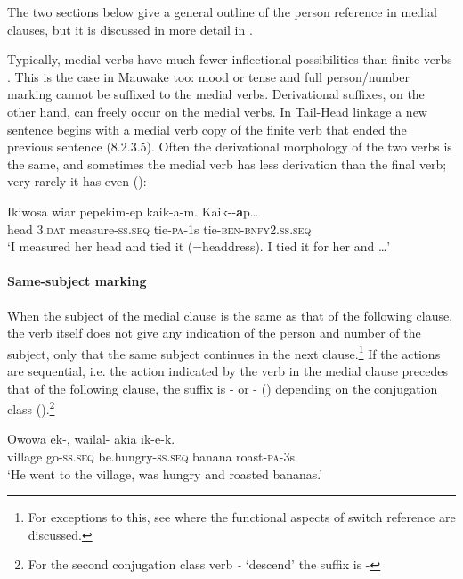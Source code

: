 The two sections below give a general outline of the person reference in medial clauses, but it is discussed in more detail in .

Typically, medial verbs have much fewer inflectional possibilities than finite verbs \citep[11]{Foley1986}. This is the case in Mauwake too: mood or tense and full person/number marking cannot be suffixed to the medial verbs. Derivational suffixes, on the other hand, can freely occur on the medial verbs. In Tail-Head linkage a new sentence begins with a medial verb copy of the finite verb that ended the previous sentence (8.2.3.5). Often the derivational morphology of the two verbs is the same, and sometimes the medial verb has less derivation than the final verb; very rarely it has even  ():

\ea%
\label{ex:x237}
\gll Ikiwosa wiar pepekim-ep kaik-a-m. Kaik--\textbf{a}p{\dots} \\
head 3.\textsc{dat} measure-\textsc{ss}.\textsc{seq} tie-\textsc{pa}-1s tie-\textsc{ben}-\textsc{bnfy}2.\textsc{ss}.\textsc{seq}\\
\glt`I measured her head and tied it (=headdress). I tied it for her and {\dots}'
\z

\paragraph[Same-subject marking]{Same-subject marking}
{}
When the subject of the medial clause is the same as that of the following clause, the verb itself does not give any indication of the person and number of the subject, only that the same subject continues in the next clause.\footnote{For exceptions to this, see  where the functional aspects of switch reference are discussed.} If the actions are sequential, i.e. the action indicated by the verb in the medial clause precedes that of the following clause, the suffix is \nobreakdash- or \nobreakdash- () depending on the conjugation class ().\footnote{For the second conjugation class verb \textit{-} `descend' the suffix is -} 

\ea%
\label{ex:x238}
\gll Owowa ek-, wailal- akia ik-e-k. \\
village go-\textsc{ss}.\textsc{seq} be.hungry-\textsc{ss}.\textsc{seq} banana roast-\textsc{pa}-3s \\
\glt`He went to the village, was hungry and roasted bananas.' 
\z

